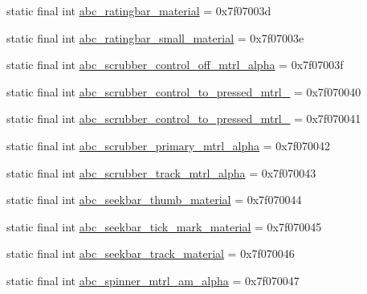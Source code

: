 \begin{DoxyCompactItemize}
\item 
static final int \mbox{\hyperlink{classandroid_1_1support_1_1design_1_1R_1_1drawable_a4892568eb27960a6aae89fa728e20c43}{abc\+\_\+ratingbar\+\_\+material}} = 0x7f07003d
\item 
static final int \mbox{\hyperlink{classandroid_1_1support_1_1design_1_1R_1_1drawable_ad398b766ff5f6e6493793c5e6819c621}{abc\+\_\+ratingbar\+\_\+small\+\_\+material}} = 0x7f07003e
\item 
static final int \mbox{\hyperlink{classandroid_1_1support_1_1design_1_1R_1_1drawable_a3965bd65870ffcee33bd193df53fe534}{abc\+\_\+scrubber\+\_\+control\+\_\+off\+\_\+mtrl\+\_\+alpha}} = 0x7f07003f
\item 
static final int \mbox{\hyperlink{classandroid_1_1support_1_1design_1_1R_1_1drawable_ae921a145d925b87b9a72c5c36932a1c9}{abc\+\_\+scrubber\+\_\+control\+\_\+to\+\_\+pressed\+\_\+mtrl\+\_}} = 0x7f070040
\item 
static final int \mbox{\hyperlink{classandroid_1_1support_1_1design_1_1R_1_1drawable_a282a94bb92c284091a6e7739ed35f7d5}{abc\+\_\+scrubber\+\_\+control\+\_\+to\+\_\+pressed\+\_\+mtrl\+\_}} = 0x7f070041
\item 
static final int \mbox{\hyperlink{classandroid_1_1support_1_1design_1_1R_1_1drawable_a3f0286813be68f3820c8e9faae29a3e9}{abc\+\_\+scrubber\+\_\+primary\+\_\+mtrl\+\_\+alpha}} = 0x7f070042
\item 
static final int \mbox{\hyperlink{classandroid_1_1support_1_1design_1_1R_1_1drawable_a6a7b5d719e7966bf2bd70f2b9528a60e}{abc\+\_\+scrubber\+\_\+track\+\_\+mtrl\+\_\+alpha}} = 0x7f070043
\item 
static final int \mbox{\hyperlink{classandroid_1_1support_1_1design_1_1R_1_1drawable_a4f8f86163f9c4645c593a97391e7c5fd}{abc\+\_\+seekbar\+\_\+thumb\+\_\+material}} = 0x7f070044
\item 
static final int \mbox{\hyperlink{classandroid_1_1support_1_1design_1_1R_1_1drawable_a84b4fc6424bc42099b2371803cdd52d7}{abc\+\_\+seekbar\+\_\+tick\+\_\+mark\+\_\+material}} = 0x7f070045
\item 
static final int \mbox{\hyperlink{classandroid_1_1support_1_1design_1_1R_1_1drawable_a7779d5fb55171a8b737a2cc5a546ccbc}{abc\+\_\+seekbar\+\_\+track\+\_\+material}} = 0x7f070046
\item 
static final int \mbox{\hyperlink{classandroid_1_1support_1_1design_1_1R_1_1drawable_ab4ab615c21373d1dce94cb8dd6e3cbe3}{abc\+\_\+spinner\+\_\+mtrl\+\_\+am\+\_\+alpha}} = 0x7f070047
\item 

\end{DoxyCompactItemize}
